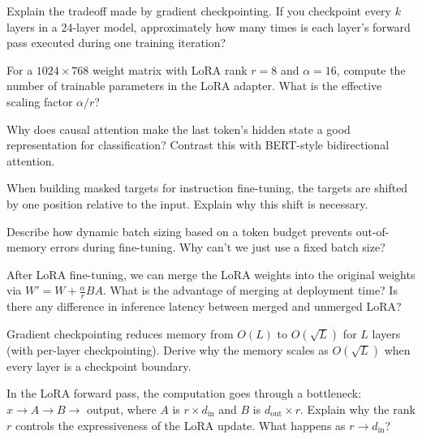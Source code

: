 \begin{reviewquestion}[5]
  Explain the tradeoff made by gradient checkpointing. If you
  checkpoint every $k$ layers in a 24-layer model, approximately how
  many times is each layer's forward pass executed during one training
  iteration?
\end{reviewquestion}

\begin{reviewquestion}[6]
  For a $1024 \times 768$ weight matrix with LoRA rank $r = 8$ and
  $\alpha = 16$, compute the number of trainable parameters in the LoRA
  adapter. What is the effective scaling factor $\alpha / r$?
\end{reviewquestion}

\begin{reviewquestion}[7]
  Why does causal attention make the last token's hidden state a good
  representation for classification? Contrast this with BERT-style
  bidirectional attention.
\end{reviewquestion}

\begin{reviewquestion}[8]
  When building masked targets for instruction fine-tuning, the targets
  are shifted by one position relative to the input. Explain why this
  shift is necessary.
\end{reviewquestion}

\begin{reviewquestion}[9]
  Describe how dynamic batch sizing based on a token budget prevents
  out-of-memory errors during fine-tuning. Why can't we just use a
  fixed batch size?
\end{reviewquestion}

\begin{reviewquestion}[10]
  After LoRA fine-tuning, we can merge the LoRA weights into the
  original weights via $W' = W + \frac{\alpha}{r}BA$. What is the
  advantage of merging at deployment time? Is there any difference in
  inference latency between merged and unmerged LoRA?
\end{reviewquestion}

\begin{reviewquestion}[11]
  Gradient checkpointing reduces memory from $O(L)$ to $O(\sqrt{L})$
  for $L$ layers (with per-layer checkpointing). Derive why the memory
  scales as $O(\sqrt{L})$ when every layer is a checkpoint boundary.
\end{reviewquestion}

\begin{reviewquestion}[12]
  In the LoRA forward pass, the computation goes through a bottleneck:
  $x \to A \to B \to$ output, where $A$ is $r \times d_{\text{in}}$
  and $B$ is $d_{\text{out}} \times r$. Explain why the rank $r$
  controls the expressiveness of the LoRA update. What happens as $r
  \to d_{\text{in}}$?
\end{reviewquestion}

